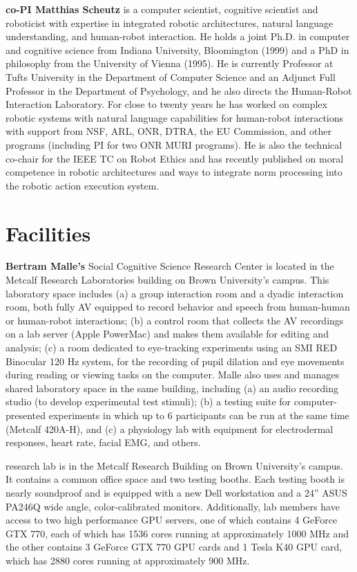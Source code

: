 \documentclass[12pt]{article}
\begin{document}
\vspace{1mm}
\noindent \textbf{co-PI  Matthias Scheutz} is a computer scientist, cognitive scientist and roboticist with expertise in integrated robotic architectures, natural
language understanding, and human-robot interaction.  He holds a joint
Ph.D. in computer and cognitive science from Indiana University,
Bloomington (1999) and a PhD in philosophy from the University of
Vienna (1995).  He is currently Professor at Tufts University in
the Department of Computer Science and an Adjunct Full Professor in the
Department of Psychology, and he also directs the Human-Robot
Interaction Laboratory.  For close to twenty years he has worked on complex robotic systems with natural language capabilities for human-robot interactions with support
from NSF, ARL, ONR, DTRA, the EU Commission, and other programs
(including  PI for two ONR MURI programs).  He is also the
technical co-chair for the IEEE TC on Robot Ethics and has recently
published on moral competence in robotic architectures and ways to
integrate norm processing into the robotic action execution system.  

\section*{Facilities}

\textbf{Bertram Malle's} Social Cognitive Science Research Center is located
in the Metcalf Research Laboratories building on Brown University’s
campus.  This laboratory space includes (a) a group interaction room and a dyadic interaction room, both fully AV equipped to record behavior and speech from human-human or human-robot interactions; (b) a control room that collects the AV recordings on a lab server (Apple PowerMac) and makes them available for editing and analysis; (c) a room dedicated to eye-tracking experiments using an SMI RED Binocular 120 Hz system, for the recording of pupil dilation and eye movements during reading or viewing tasks on the computer.  Malle also uses and manages shared laboratory space in the same building, including (a) an audio recording studio (to develop experimental test stimuli); (b) a testing suite for computer-presented experiments in which up to 6 participants can be run at the same time (Metcalf 420A-H), and (c) a physiology lab with equipment for electrodermal responses, heart rate, facial EMG, and others.

\vspace{1 mm} 

 research lab is in the Metcalf
Research Building on Brown University’s campus. It contains a common
office space and two testing booths. Each testing booth is nearly
soundproof and is equipped with a new Dell workstation and a 24” ASUS
PA246Q wide angle, color-calibrated monitors.  Additionally, lab members have access to two high performance
GPU servers, one of which contains 4 GeForce GTX 770, each of which
has 1536 cores running at approximately 1000 MHz and the other
contains 3 GeForce GTX 770 GPU cards and 1 Tesla K40 GPU card, which
has 2880 cores running at approximately 900 MHz. 
\end{document}
